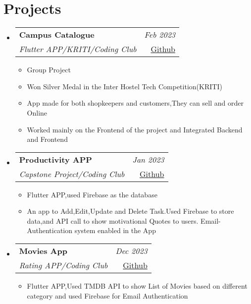 \documentclass[a4paper,11pt]{article}
\makeatletter
\newcommand{\resumeSubheading}[4]{
\vspace{0.5mm}\item
    \begin{tabular*}{0.98\textwidth}[t]{l@{\extracolsep{\fill}}r}
        \textbf{#1} & \textit{\footnotesize{#4}} \\
        \textit{\footnotesize{#3}} &  \footnotesize{#2}\\
    \end{tabular*}
    \vspace{-2.4mm}
}
\newcommand{\resumeProject}[4]{
\vspace{0.5mm}\item
    \begin{tabular*}{0.98\textwidth}[t]{l@{\extracolsep{\fill}}r}
        \textbf{#1} & \textit{\footnotesize{#3}} \\
        \footnotesize{\textit{#2}} & \footnotesize{#4}
    \end{tabular*}
    \vspace{-2.4mm}
}
\newcommand{\resumeSubHeadingListStart}{\begin{itemize}[leftmargin=*,labelsep=0mm]}
\newcommand{\resumeItemListStart}{\begin{justify}\begin{itemize}[leftmargin=3ex, rightmargin=2ex, noitemsep,labelsep=1.2mm,itemsep=0mm]\small}
\newcommand{\resumeSubHeadingListEnd}{\end{itemize}\vspace{2mm}}
\newcommand{\resumeItemListEnd}{\end{itemize}\end{justify}\vspace{-2mm}}
\makeatother
\begin{document}

    
      
\section{Projects}
\resumeSubHeadingListStart
    
    \resumeProject
      {Campus Catalogue} %
      { Flutter APP/KRITI/Coding Club} %
      {Feb 2023} %
      {\href{https://github.com/Hareesh-Nandigrama/catalogue}{Github}} %
      \resumeItemListStart
        \item {Group Project}
        \item {Won Silver Medal in the Inter Hostel Tech Competition(KRITI)}
        \item {App made for both shopkeepers and customers,They can sell and order  Online}
        \item {Worked mainly on the Frontend of the project and Integrated Backend and Frontend}
    \resumeItemListEnd
    
    \resumeProject
      {Productivity APP}
      {Capstone Project/Coding Club}{Jan 2023}{\href{https://github.com/Ashutosh-777/Productivity_App}{Github}}
      \resumeItemListStart
    \item { Flutter APP,used Firebase as the database}
        \item { An app to Add,Edit,Update and Delete Task.Used Firebase to store data,and API call to show motivational Quotes
to users. Email-Authentication system enabled in the App
}
    \resumeItemListEnd
        \resumeProject
      {Movies App}
      {Rating APP/Coding Club}{Dec 2023}{\href{https://github.com/Ashutosh-777/Movies_ratings}{Github}}
      \resumeItemListStart
    \item { Flutter APP,Used TMDB API to show List of Movies based on different category and used Firebase for Email Authentication}
    \resumeItemListEnd       
  \resumeSubHeadingListEnd
\vspace{-5.5mm}
\end{document}
